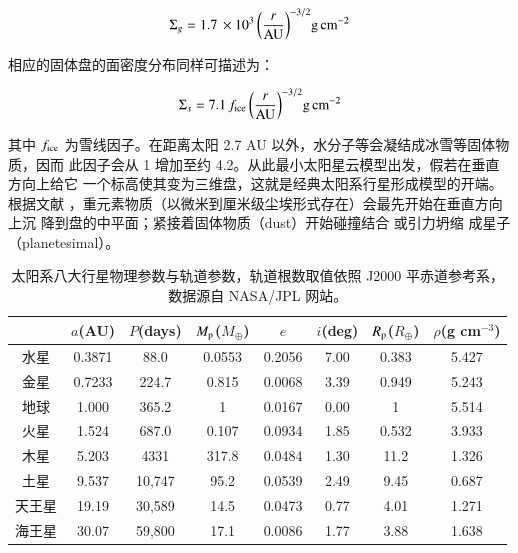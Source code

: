 \begin{equation} \label{eq:mmsng}
\Sigma_g = 1.7 \,\times10^3 \, \bigg(\frac{r}{\mathrm{AU}}\bigg)^{-3/2}  \mathrm{g} \,\mathrm{cm}^{-2}
\end{equation} %

相应的固体盘的面密度分布同样可描述为：

\begin{equation} \label{eq:mmsns}
\Sigma_s = 7.1 \, f_\mathrm{ice} \, \bigg(\frac{r}{\mathrm{AU}}\bigg)^{-3/2}  \mathrm{g} \,\mathrm{cm}^{-2}
\end{equation} %

其中 $f_\mathrm{ice}$ 为雪线因子。在距离太阳 2.7 AU 以外，水分子等会凝结成冰雪等固体物质，因而
此因子会从 1 增加至约 4.2\cite{IdaLin2004}。从此最小太阳星云模型出发，假若在垂直方向上给它
一个标高使其变为三维盘，这就是经典太阳系行星形成模型的开端。根据文献 
，重元素物质（以微米到厘米级尘埃形式存在）会最先开始在垂直方向上沉
降到盘的中平面；紧接着固体物质（dust）开始碰撞结合
\cite{ppvibook2014,Weidenschilling1997,BlumWurm2008}或引力坍缩
\cite{Safronov1972,GoldreichWard1973,YoudinShu2002,ChiangYoudin2010}成星子（planetesimal）。

\begin{table}[t]
\centering
\caption{太阳系八大行星物理参数与轨道参数，轨道根数取值依照 J2000 平赤道参考系，数据源自 NASA/JPL 网站。}
\label{tbl:solarsystem}
\begin{tabular}{cccccccc}
\hline \hline
  & $a$(AU) & $P$(days) & $M_\mathrm{p}$($M_\oplus$) &  $e$ &  $i$(deg) &  $R_\mathrm{p}$($R_\oplus$) & $\rho$(g cm$^{-3}$) \\ \hline
水星        &   0.3871    &   88.0      &  0.0553    & 0.2056  &  7.00    &   0.383   &   5.427      \\
金星        &   0.7233    &   224.7    &  0.815      & 0.0068  &  3.39    &   0.949   &   5.243      \\
地球        &   1.000      &   365.2     &  1            & 0.0167 &   0.00    &   1          &   5.514      \\
火星        &   1.524      &   687.0     &  0.107     & 0.0934 &   1.85    &   0.532   &   3.933      \\
木星        &   5.203      &   4331      &  317.8     & 0.0484  &  1.30    &   11.2     &   1.326      \\
土星        &    9.537     &   10,747   &  95.2       & 0.0539 &    2.49   &   9.45     &   0.687      \\
天王星     &   19.19     &    30,589   &  14.5       & 0.0473 &   0.77    &   4.01     &  1.271       \\
海王星     &   30.07     &    59,800   &  17.1       & 0.0086 &    1.77   &    3.88    &  1.638       \\
\hline \hline
\end{tabular}
\end{table}

